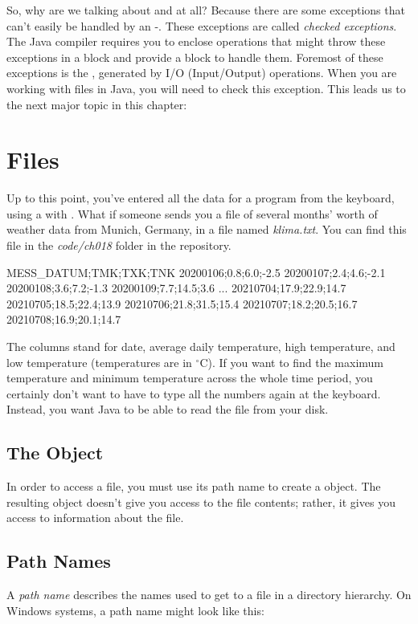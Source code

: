 
So, why are we talking about  and  at all? Because there are some exceptions that can't easily be handled by an -. These exceptions are called {\em checked exceptions}. The Java compiler requires you to enclose operations that might throw these exceptions in a  block and provide a  block to handle them. Foremost of these exceptions is the , generated by I/O (Input/Output) operations. When you are working with files in Java, you will need to check this exception. This leads us to the next major topic in this chapter:

\section{Files}

Up to this point, you've entered all the data for a program from the keyboard, using a  with .  What if someone sends you a file of several months' worth of weather data from Munich, Germany, in a file named {\em klima.txt}. You can find this file in the {\em code/ch018} folder in the repository.

\begin{stdout}
MESS_DATUM;TMK;TXK;TNK
20200106;0.8;6.0;-2.5
20200107;2.4;4.6;-2.1
20200108;3.6;7.2;-1.3
20200109;7.7;14.5;3.6
...
20210704;17.9;22.9;14.7
20210705;18.5;22.4;13.9
20210706;21.8;31.5;15.4
20210707;18.2;20.5;16.7
20210708;16.9;20.1;14.7
\end{stdout}

The columns stand for date, average daily temperature, high temperature, and low temperature (temperatures are in $^\circ$C).
If you want to find the maximum temperature and minimum temperature across the whole time period, you certainly don't want to have to type all the numbers again at the keyboard. Instead, you want Java to be able to read the file from your disk.

\subsection{The  Object}
In order to access a file, you must use its path name to create a  object. The resulting object doesn't give you access to the file contents; rather, it gives you access to information about the file.

\subsection{Path Names}
A {\em path name} describes the names used to get to a file in a directory hierarchy. On Windows systems, a path name might look like this:

